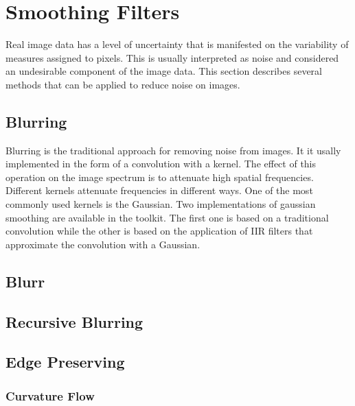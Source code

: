 \section{Smoothing Filters}
\label{sec:SmoothingFilters}

Real image data has a level of uncertainty that is manifested on the
variability of measures assigned to pixels. This is usually interpreted as
noise and considered an undesirable component of the image data. This section
describes several methods that can be applied to reduce noise on images.

\subsection{Blurring}
\label{sec:BlurringFilters}

Blurring is the traditional approach for removing noise from images. It it
usally implemented in the form of a convolution with a kernel. The effect of
this operation on the image spectrum is to attenuate high spatial frequencies.
Different kernels attenuate frequencies in different ways. One of the most
commonly used kernels is the Gaussian. Two implementations of gaussian
smoothing are available in the toolkit. The first one is based on a traditional
convolution while the other is based on the application of IIR filters that
approximate the convolution with a Gaussian. 

\subsection{Blurr}
\label{sec:GaussianConvolutionFilter}

\subsection{Recursive Blurring}
\label{sec:RecursiveGaussianSmoothingFilter}


\subsection{Edge Preserving}
\label{sec:EdgePreservingFilters}


\subsubsection{Curvature Flow}
\label{sec:CurvatureFlowImageFilter}



